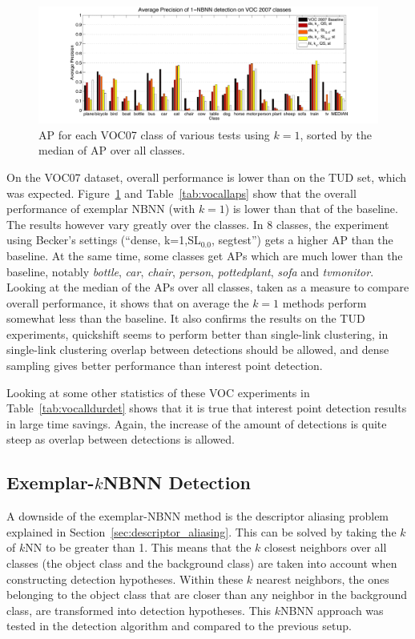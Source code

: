 \begin{figure}[hbt]
    \centering
    \includegraphics[width=\textwidth]{VOCk1ap}
    \caption{AP for each VOC07 class of various tests using $k=1$, sorted by the median of AP over all classes.}
    \label{fig:vock1ap}
\end{figure}

On the VOC07 dataset, overall performance is lower than on the TUD set, which was expected. Figure~\ref{fig:vock1ap} and Table~\ref{tab:vocallaps} show that the overall performance of exemplar NBNN (with $k=1$) is lower than that of the baseline. The results however vary greatly over the classes. In 8 classes, the experiment using Becker's settings (``dense, k=1,SL$_{0.0}$, segtest'') gets a higher AP than the baseline. At the same time, some classes get APs which are much lower than the baseline, notably \emph{bottle}, \emph{car}, \emph{chair}, \emph{person}, \emph{pottedplant}, \emph{sofa} and \emph{tvmonitor}. Looking at the median of the APs over all classes, taken as a measure to compare overall performance, it shows that on average the $k=1$ methods perform somewhat less than the baseline. It also confirms the results on the TUD experiments, quickshift seems to perform better than single-link clustering, in single-link clustering overlap between detections should be allowed, and dense sampling gives better performance than interest point detection.

Looking at some other statistics of these VOC experiments in Table~\ref{tab:vocalldurdet} shows that it is true that interest point detection results in large time savings. Again, the increase of the amount of detections is quite steep as overlap between detections is allowed.



\subsection{Exemplar-$k$NBNN Detection} %
\label{sec:local_nbnn_detection}
A downside of the exemplar-NBNN method is the descriptor aliasing problem explained in Section~\ref{sec:descriptor_aliasing}. This can be solved by taking the $k$ of $k$NN to be greater than 1. This means that the $k$ closest neighbors over all classes (the object class and the background class) are taken into account when constructing detection hypotheses. Within these $k$ nearest neighbors, the ones belonging to the object class that are closer than any neighbor in the background class, are transformed into detection hypotheses. This $k$NBNN approach was tested in the detection algorithm and compared to the previous setup. 

